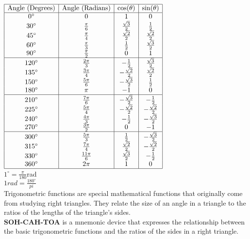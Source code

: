 \documentclass{article}
\begin{document}
$
\begin{array}{|c|c|c|c|}
\hline
\text{Angle (Degrees)} & \text{Angle (Radians)} & \cos(\theta) & \sin(\theta) \\
\hline
0^\circ & 0 & 1 & 0 \\
30^\circ & \frac{\pi}{6} & \frac{\sqrt{3}}{2} & \frac{1}{2} \\
45^\circ & \frac{\pi}{4} & \frac{\sqrt{2}}{2} & \frac{\sqrt{2}}{2} \\
60^\circ & \frac{\pi}{3} & \frac{1}{2} & \frac{\sqrt{3}}{2} \\
90^\circ & \frac{\pi}{2} & 0 & 1 \\
\hline
120^\circ & \frac{2\pi}{3} & -\frac{1}{2} & \frac{\sqrt{3}}{2} \\
135^\circ & \frac{3\pi}{4} & -\frac{\sqrt{2}}{2} & \frac{\sqrt{2}}{2} \\
150^\circ & \frac{5\pi}{6} & -\frac{\sqrt{3}}{2} & \frac{1}{2} \\
180^\circ & \pi & -1 & 0 \\
\hline
210^\circ & \frac{7\pi}{6} & -\frac{\sqrt{3}}{2} & -\frac{1}{2} \\
225^\circ & \frac{5\pi}{4} & -\frac{\sqrt{2}}{2} & -\frac{\sqrt{2}}{2} \\
240^\circ & \frac{4\pi}{3} & -\frac{1}{2} & -\frac{\sqrt{3}}{2} \\
270^\circ & \frac{3\pi}{2} & 0 & -1 \\
\hline
300^\circ & \frac{5\pi}{3} & \frac{1}{2} & -\frac{\sqrt{3}}{2} \\
315^\circ & \frac{7\pi}{4} & \frac{\sqrt{2}}{2} & -\frac{\sqrt{2}}{2} \\
330^\circ & \frac{11\pi}{6} & \frac{\sqrt{3}}{2} & -\frac{1}{2} \\
360^\circ & 2\pi & 1 & 0 \\
\hline
\end{array}
$\\

$1^\circ = \frac{\pi}{180}$rad\\
$1 rad = \frac{180^\circ}{pi}$\\

Trigonometric functions are special mathematical functions that originally come from studying right triangles. They relate the size of an angle in a triangle to the ratios of the lengths of the triangle's sides.\\

\textbf{SOH-CAH-TOA} is a mnemonic device that expresses the relationship between the basic trigonometric functions and the ratios of the sides in a right triangle.\\
\end{document}
